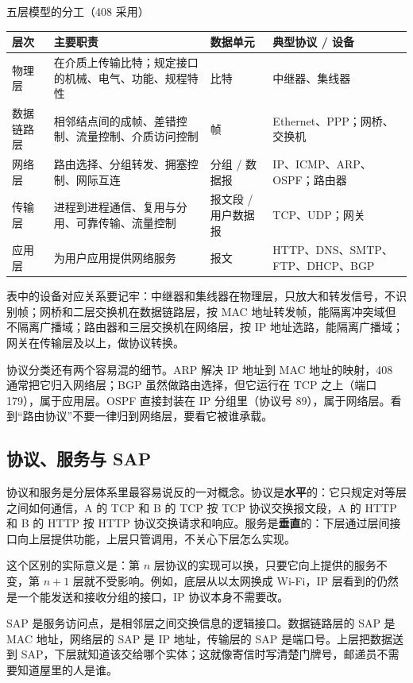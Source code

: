\begin{tablebox}{五层模型的分工（408 采用）}
\centering
\small
\begin{tabularx}{\linewidth}{|p{1.35cm}|X|p{2.35cm}|p{3.0cm}|}
\hline
层次 & 主要职责 & 数据单元 & 典型协议 / 设备 \\
\hline
物理层 & 在介质上传输比特；规定接口的机械、电气、功能、规程特性 & 比特 & 中继器、集线器 \\
\hline
数据链路层 & 相邻结点间的成帧、差错控制、流量控制、介质访问控制 & 帧 & Ethernet、PPP；网桥、交换机 \\
\hline
网络层 & 路由选择、分组转发、拥塞控制、网际互连 & 分组 / 数据报 & IP、ICMP、ARP、OSPF；路由器 \\
\hline
传输层 & 进程到进程通信、复用与分用、可靠传输、流量控制 & 报文段 / 用户数据报 & TCP、UDP；网关 \\
\hline
应用层 & 为用户应用提供网络服务 & 报文 & HTTP、DNS、SMTP、FTP、DHCP、BGP \\
\hline
\end{tabularx}
\end{tablebox}

表中的设备对应关系要记牢：中继器和集线器在物理层，只放大和转发信号，不识别帧；网桥和二层交换机在数据链路层，按 MAC 地址转发帧，能隔离冲突域但不隔离广播域；路由器和三层交换机在网络层，按 IP 地址选路，能隔离广播域；网关在传输层及以上，做协议转换。

协议分类还有两个容易混的细节。ARP 解决 IP 地址到 MAC 地址的映射，408 通常把它归入网络层；BGP 虽然做路由选择，但它运行在 TCP 之上（端口 179），属于应用层。OSPF 直接封装在 IP 分组里（协议号 89），属于网络层。看到“路由协议”不要一律归到网络层，要看它被谁承载。

\subsection{协议、服务与 SAP}

协议和服务是分层体系里最容易说反的一对概念。协议是\textbf{水平}的：它只规定对等层之间如何通信，A 的 TCP 和 B 的 TCP 按 TCP 协议交换报文段，A 的 HTTP 和 B 的 HTTP 按 HTTP 协议交换请求和响应。服务是\textbf{垂直}的：下层通过层间接口向上层提供功能，上层只管调用，不关心下层怎么实现。

这个区别的实际意义是：第 $n$ 层协议的实现可以换，只要它向上提供的服务不变，第 $n+1$ 层就不受影响。例如，底层从以太网换成 Wi-Fi，IP 层看到的仍然是一个能发送和接收分组的接口，IP 协议本身不需要改。

SAP 是服务访问点，是相邻层之间交换信息的逻辑接口。数据链路层的 SAP 是 MAC 地址，网络层的 SAP 是 IP 地址，传输层的 SAP 是端口号。上层把数据送到 SAP，下层就知道该交给哪个实体；这就像寄信时写清楚门牌号，邮递员不需要知道屋里的人是谁。

